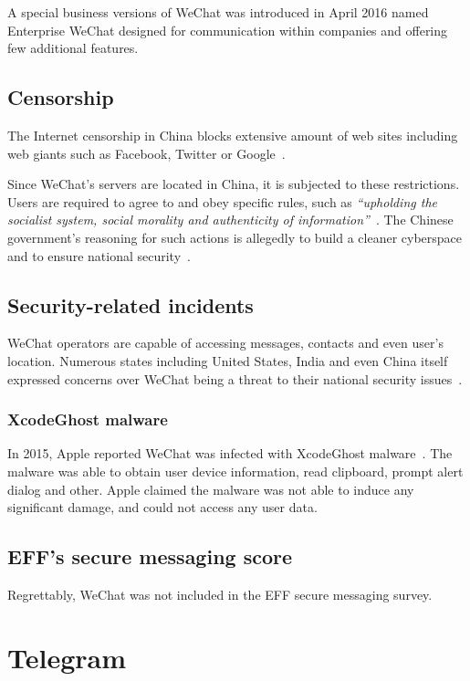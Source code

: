 \documentclass[thesis=M,english]{FITthesis}[2012/10/20]
\begin{document}
A special business versions of WeChat was introduced in April 2016 named Enterprise WeChat designed for communication within companies and offering few additional features.

\subsection{Censorship}

The Internet censorship in China blocks extensive amount of web sites including web giants such as Facebook, Twitter or Google~\cite{china-twitter,china-facebook}.

Since WeChat's servers are located in China, it is subjected to these restrictions. Users are required to agree to and obey specific rules, such as \emph{``upholding the socialist system, social morality and authenticity of information''}~\cite{china-imblocking}. The Chinese government's reasoning for such actions is allegedly to build a cleaner cyberspace and to ensure national security~\cite{china-blocking2}.

\subsection{Security-related incidents}

WeChat operators are capable of accessing messages, contacts and even user's location. Numerous states including United States, India and even China itself expressed concerns over WeChat being a threat to their national security issues~\cite{wechat-states}.

\subsubsection{XcodeGhost malware}

In 2015, Apple reported WeChat was infected with XcodeGhost malware~\cite{wechat-xcodemalware}. The malware was able to obtain user device information, read clipboard, prompt alert dialog and other. Apple claimed the malware was not able to induce any significant damage, and could not access any user data.

\subsection{EFF's secure messaging score}

Regrettably, WeChat was not included in the EFF secure messaging survey.


\section{Telegram}
\end{document}
